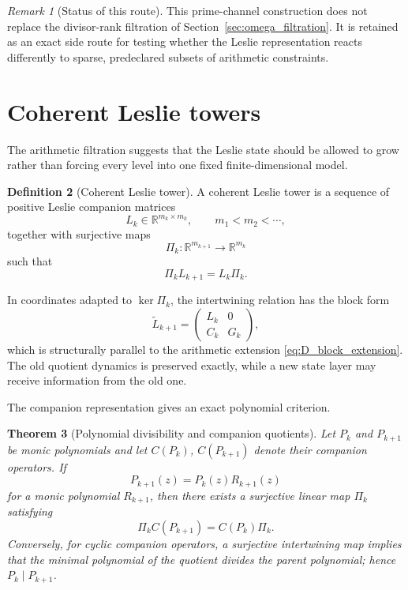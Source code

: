 \documentclass[11pt]{amsart}
\numberwithin{equation}{section}
\theoremstyle{plain}
\newtheorem{theorem}{Theorem}[section]
\theoremstyle{definition}
\newtheorem{definition}[theorem]{Definition}
\theoremstyle{remark}
\newtheorem{remark}[theorem]{Remark}
\begin{document}
\begin{remark}[Status of this route]
\label{rem:prime_route_status}
This prime-channel construction does not replace the divisor-rank filtration of
Section~\ref{sec:omega_filtration}.  It is retained as an exact side route for testing whether
the Leslie representation reacts differently to sparse, predeclared subsets of arithmetic
constraints.
\end{remark}


\section{Coherent Leslie towers}
\label{sec:coherent_leslie_towers}

The arithmetic filtration suggests that the Leslie state should be allowed to grow rather than
forcing every level into one fixed finite-dimensional model.

\begin{definition}[Coherent Leslie tower]
\label{def:coherent_leslie_tower}
A coherent Leslie tower is a sequence of positive Leslie companion matrices
\[
L_k\in\mathbb R^{m_k\times m_k},
\qquad
m_1<m_2<\cdots,
\]
together with surjective maps
\[
\Pi_k:\mathbb R^{m_{k+1}}\to\mathbb R^{m_k}
\]
such that
\begin{equation}
\boxed{\Pi_kL_{k+1}=L_k\Pi_k.}
\label{eq:leslie_intertwining}
\end{equation}
\end{definition}

In coordinates adapted to $\ker\Pi_k$, the intertwining relation has the block form
\begin{equation}
\widetilde L_{k+1}
=
\begin{pmatrix}
L_k&0\\
C_k&G_k
\end{pmatrix},
\label{eq:leslie_block_tower}
\end{equation}
which is structurally parallel to the arithmetic extension
\eqref{eq:D_block_extension}.  The old quotient dynamics is preserved exactly, while a new
state layer may receive information from the old one.

The companion representation gives an exact polynomial criterion.

\begin{theorem}[Polynomial divisibility and companion quotients]
\label{thm:companion_quotient}
Let $P_k$ and $P_{k+1}$ be monic polynomials and let $C(P_k)$,
$C(P_{k+1})$ denote their companion operators.  If
\begin{equation}
P_{k+1}(z)=P_k(z)R_{k+1}(z)
\label{eq:nested_characteristic_polynomials}
\end{equation}
for a monic polynomial $R_{k+1}$, then there exists a surjective linear map $\Pi_k$ satisfying
\[
\Pi_kC(P_{k+1})=C(P_k)\Pi_k.
\]
Conversely, for cyclic companion operators, a surjective intertwining map implies that the
minimal polynomial of the quotient divides the parent polynomial; hence
$P_k\mid P_{k+1}$.
\end{theorem}
\end{document}
